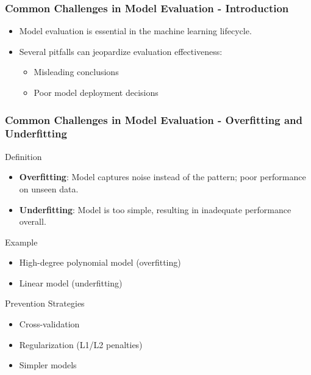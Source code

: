 \documentclass[aspectratio=169]{beamer}
\begin{document}
\begin{frame}[fragile]
    \frametitle{Common Challenges in Model Evaluation - Introduction}
    \begin{itemize}
        \item Model evaluation is essential in the machine learning lifecycle.
        \item Several pitfalls can jeopardize evaluation effectiveness:
        \begin{itemize}
            \item Misleading conclusions
            \item Poor model deployment decisions
        \end{itemize}
    \end{itemize}
\end{frame}

\begin{frame}[fragile]
    \frametitle{Common Challenges in Model Evaluation - Overfitting and Underfitting}
    \begin{block}{Definition}
        \begin{itemize}
            \item \textbf{Overfitting}: Model captures noise instead of the pattern; poor performance on unseen data.
            \item \textbf{Underfitting}: Model is too simple, resulting in inadequate performance overall.
        \end{itemize}
    \end{block}
    
    \begin{block}{Example}
        \begin{itemize}
            \item High-degree polynomial model (overfitting)
            \item Linear model (underfitting)
        \end{itemize}
    \end{block}
    
    \begin{block}{Prevention Strategies}
        \begin{itemize}
            \item Cross-validation
            \item Regularization (L1/L2 penalties)
            \item Simpler models
        \end{itemize}
    \end{block}
\end{frame}
\end{document}
